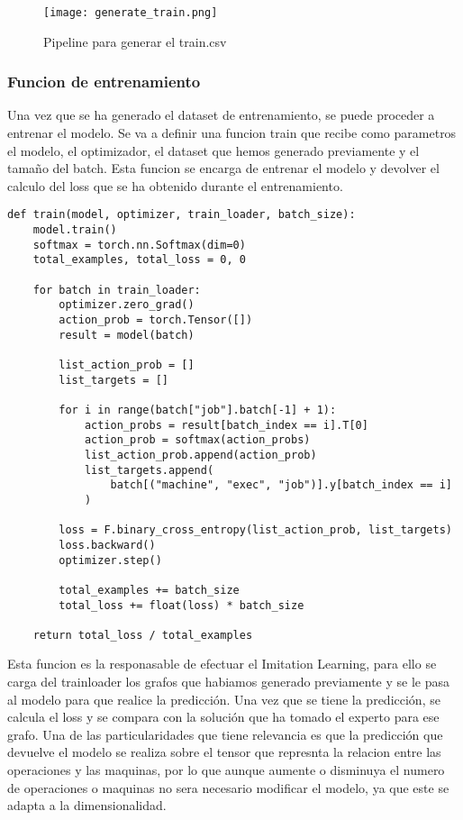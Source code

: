 \begin{figure}[ht]
    \centering
    \texttt{[image: generate\_train.png]}
    \caption{Pipeline para generar el train.csv}
    \label{fig:trainingpipeline}
\end{figure}

\subsubsection{Funcion de entrenamiento}
Una vez que se ha generado el dataset de entrenamiento, se puede proceder a entrenar el modelo.
Se va a definir una funcion train que recibe como parametros el modelo, el optimizador, el dataset
que hemos generado previamente y el tamaño del batch. Esta funcion se encarga de entrenar el modelo
y devolver el calculo del loss que se ha obtenido durante el entrenamiento.\medskip

\begin{lstlisting}
def train(model, optimizer, train_loader, batch_size):
    model.train()
    softmax = torch.nn.Softmax(dim=0)
    total_examples, total_loss = 0, 0

    for batch in train_loader:
        optimizer.zero_grad()
        action_prob = torch.Tensor([])
        result = model(batch)

        list_action_prob = []
        list_targets = []

        for i in range(batch["job"].batch[-1] + 1):
            action_probs = result[batch_index == i].T[0]
            action_prob = softmax(action_probs)
            list_action_prob.append(action_prob)
            list_targets.append(
                batch[("machine", "exec", "job")].y[batch_index == i]
            )

        loss = F.binary_cross_entropy(list_action_prob, list_targets)
        loss.backward()
        optimizer.step()

        total_examples += batch_size
        total_loss += float(loss) * batch_size

    return total_loss / total_examples 
\end{lstlisting}\medskip

Esta funcion es la responasable de efectuar el Imitation Learning, para ello se carga del
trainloader los grafos que habiamos generado previamente y se le pasa al modelo para que
realice la predicción. Una vez que se tiene la predicción, se calcula el loss y se compara
con la solución que ha tomado el experto para ese grafo. Una de las particularidades que
tiene relevancia es que la predicción que devuelve el modelo se realiza sobre el tensor
que represnta la relacion entre las operaciones y las maquinas, por lo que aunque
aumente o disminuya el numero de operaciones o maquinas no sera necesario modificar
el modelo, ya que este se adapta a la dimensionalidad.

